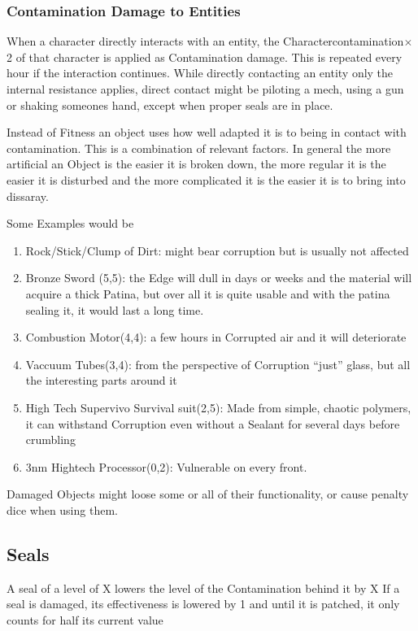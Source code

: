 \subsubsection{Contamination Damage to Entities}
When a character directly interacts with an entity, the Charactercontamination\(\times\)2
of that character is applied as Contamination damage.
This is repeated every hour if the interaction continues.
While directly contacting an entity only the internal resistance applies, direct contact might be piloting a mech,
using a gun or shaking someones hand, except when proper seals are in place.

Instead of Fitness an object uses how well adapted it is to being in contact with contamination.
This is a combination of relevant factors.
In general the more artificial an Object is the easier it is broken down,
the more regular it is the easier it is disturbed and the more complicated it is the easier it is to bring into dissaray.

Some Examples would be

\begin{enumerate}
    \item Rock/Stick/Clump of Dirt: might bear corruption but is usually not affected
    \item Bronze Sword (5,5): the Edge will dull in days or weeks and the material will acquire a thick Patina,
    but over all it is quite usable and with the patina sealing it, it would last a long time.
    \item Combustion Motor(4,4): a few hours in Corrupted air and it will deteriorate
    \item Vaccuum Tubes(3,4): from the perspective of Corruption ``just'' glass, but all the interesting parts around it
    \item High Tech Supervivo Survival suit(2,5): Made from simple, chaotic polymers, it can
    withstand Corruption even without a Sealant for several days before crumbling
    \item 3nm Hightech Processor(0,2): Vulnerable on every front.
\end{enumerate}


Damaged Objects might loose some or all of their functionality, or cause penalty dice when using them.

\subsection{Seals}\label{subsec:seals}
A seal of a level of X lowers the level of the Contamination behind it by X
If a seal is damaged, its effectiveness is lowered by 1 and until it is patched, it only counts for half
its current value

